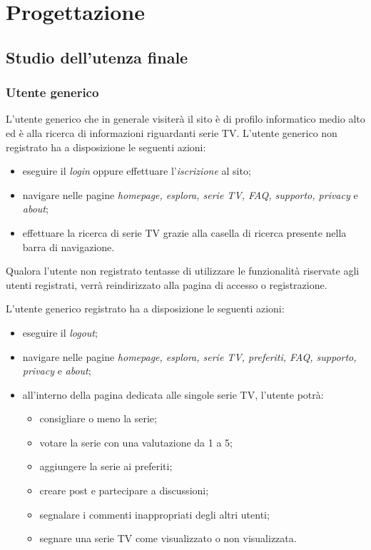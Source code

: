 \newpage
\section{Progettazione}
\subsection{Studio dell'utenza finale}
\subsubsection{Utente generico}
L'utente generico che in generale visiterà il sito è di profilo informatico medio alto ed è alla ricerca di informazioni riguardanti serie TV.
L'utente generico non registrato ha a disposizione le seguenti azioni:
\begin{itemize}
	\item eseguire il \textit{login} oppure effettuare l'\textit{iscrizione} al sito;
	\item navigare nelle pagine \textit{homepage, esplora, serie TV, FAQ, supporto, privacy} e \textit{about};
	\item effettuare la ricerca di serie TV grazie alla casella di ricerca presente nella barra di navigazione.
\end{itemize}
Qualora l'utente non registrato tentasse di utilizzare le funzionalità riservate agli utenti registrati, verrà reindirizzato alla pagina di accesso o registrazione.

L'utente generico registrato ha a disposizione le seguenti azioni:
\begin{itemize}
	\item eseguire il \textit{logout};
	\item navigare nelle pagine \textit{homepage, esplora, serie TV, preferiti, FAQ, supporto, privacy} e \textit{about};
	\item all'interno della pagina dedicata alle singole serie TV, l'utente potrà:
	\begin{itemize}
		\item consigliare o meno la serie;
		\item votare la serie con una valutazione da 1 a 5;
		\item aggiungere la serie ai preferiti; 
		\item creare post e partecipare a discussioni;
		\item segnalare i commenti inappropriati degli altri utenti;
		\item segnare una serie TV come visualizzato o non visualizzata.
	\end{itemize}
\end{itemize}


